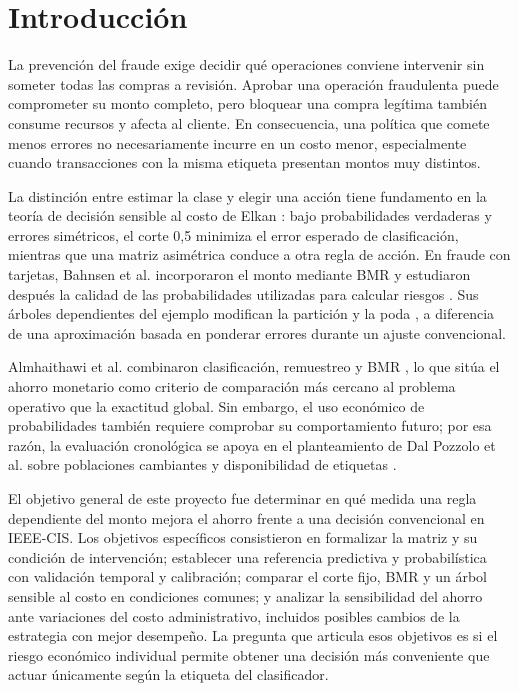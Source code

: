 \documentclass[conference,letterpaper]{IEEEtran}
\begin{document}
\section{Introducción}
La prevención del fraude exige decidir qué operaciones conviene intervenir sin someter todas las compras a revisión. Aprobar una operación fraudulenta puede comprometer su monto completo, pero bloquear una compra legítima también consume recursos y afecta al cliente. En consecuencia, una política que comete menos errores no necesariamente incurre en un costo menor, especialmente cuando transacciones con la misma etiqueta presentan montos muy distintos.

La distinción entre estimar la clase y elegir una acción tiene fundamento en la teoría de decisión sensible al costo de Elkan \cite{elkan}: bajo probabilidades verdaderas y errores simétricos, el corte 0,5 minimiza el error esperado de clasificación, mientras que una matriz asimétrica conduce a otra regla de acción. En fraude con tarjetas, Bahnsen et al. incorporaron el monto mediante BMR \cite{bmr} y estudiaron después la calidad de las probabilidades utilizadas para calcular riesgos \cite{calibrated}. Sus árboles dependientes del ejemplo modifican la partición y la poda \cite{csdt}, a diferencia de una aproximación basada en ponderar errores durante un ajuste convencional.

Almhaithawi et al. combinaron clasificación, remuestreo y BMR \cite{almhaithawi}, lo que sitúa el ahorro monetario como criterio de comparación más cercano al problema operativo que la exactitud global. Sin embargo, el uso económico de probabilidades también requiere comprobar su comportamiento futuro; por esa razón, la evaluación cronológica se apoya en el planteamiento de Dal Pozzolo et al. sobre poblaciones cambiantes y disponibilidad de etiquetas \cite{dalpozzolo}.

El objetivo general de este proyecto fue determinar en qué medida una regla dependiente del monto mejora el ahorro frente a una decisión convencional en IEEE-CIS. Los objetivos específicos consistieron en formalizar la matriz y su condición de intervención; establecer una referencia predictiva y probabilística con validación temporal y calibración; comparar el corte fijo, BMR y un árbol sensible al costo en condiciones comunes; y analizar la sensibilidad del ahorro ante variaciones del costo administrativo, incluidos posibles cambios de la estrategia con mejor desempeño. La pregunta que articula esos objetivos es si el riesgo económico individual permite obtener una decisión más conveniente que actuar únicamente según la etiqueta del clasificador.
\end{document}
